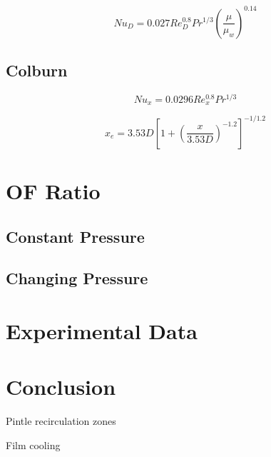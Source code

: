 \documentclass[11pt]{article}
\begin{document}
\begin{equation}
  Nu_{D} = 0.027 Re_{D}^{0.8} Pr^{1/3} \left( \frac{\mu}{\mu_w} \right)^{0.14}
\end{equation}

\subsection{Colburn}

\begin{equation}
  Nu_x = 0.0296 Re_x^{0.8} Pr^{1/3}
\end{equation}

\begin{equation}
  x_e = 3.53D \left[ 1 + \left( \frac{x}{3.53D} \right)^{-1.2}\right]^{-1/1.2}
\end{equation}

\section{OF Ratio}

\subsection{Constant Pressure}

\subsection{Changing Pressure}

\section{Experimental Data}


\section{Conclusion}

Pintle recirculation zones

Film cooling
\end{document}

